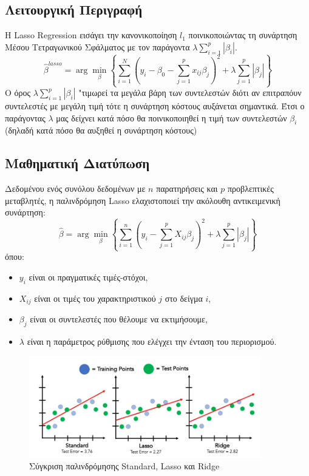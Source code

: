 \documentclass[12pt]{article}
\begin{document}
\subsection{Λειτουργική Περιγραφή}
Η \textlatin{Lasso Regression} εισάγει την κανονικοποίηση $l_1$ ποινικοποιώντας τη συνάρτηση Μέσου Τετραγωνικού Σφάλματος με τον παράγοντα  $\lambda \sum_{i=1}^{p} |\beta_i|$.
\begin{equation}
    \hat{\beta}^{lasso} = \arg \min_{\beta} \left\{\sum_{i=1}^{N} \left( y_i - \beta_0 - \sum_{j=1}^{p} x_{ij} \beta_j \right)^2 + \lambda \sum_{j=1}^{p} |\beta_j| \right\}
\end{equation}
Ο όρος $\lambda \sum_{i=1}^{p} |\beta_i|$ "τιμωρεί τα μεγάλα βάρη των συντελεστών διότι αν επιτραπόυν συντελεστές με μεγάλη τιμή τότε η συνάρτηση κόστους αυξάνεται σημαντικά. Έτσι ο παράγοντας $\lambda$ μας δείχνει κατά πόσο θα ποινικοποιηθεί η τιμή των συντελεστών $\beta_i$ (δηλαδή κατά πόσο θα αυξηθεί η συνάρτηση κόστους)

\subsection{Μαθηματική Διατύπωση}
Δεδομένου ενός συνόλου δεδομένων με $n$ παρατηρήσεις και $p$ προβλεπτικές μεταβλητές, η παλινδρόμηση \textlatin{Lasso} ελαχιστοποιεί την ακόλουθη αντικειμενική συνάρτηση:
\begin{equation}
    \hat{\beta} = \arg \min_{\beta} \left\{ \sum_{i=1}^{n} (y_i - \sum_{j=1}^{p} X_{ij} \beta_j)^2 + \lambda \sum_{j=1}^{p} |\beta_j| \right\}
\end{equation}
όπου:
\begin{itemize}
    \item $y_i$ είναι οι πραγματικές τιμές-στόχοι,
    \item $X_{ij}$ είναι οι τιμές του χαρακτηριστικού $j$ στο δείγμα $i$,
    \item $\beta_j$ είναι οι συντελεστές που θέλουμε να εκτιμήσουμε,
    \item $\lambda$ είναι η παράμετρος ρύθμισης που ελέγχει την ένταση του περιορισμού.
\end{itemize}

\begin{figure}
    \centering
    \includegraphics[width=0.9\textwidth]{./images/Lasso.png}
    \caption{Σύγκριση παλινδρόμησης Standard, Lasso και Ridge}
    \label{fig:Lasso}
\end{figure}
\end{document}
